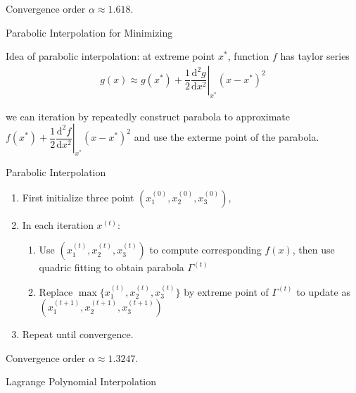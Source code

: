     Convergence order $ \alpha \approx 1.618 $.

\begin{point}
    \hypertarget{ParabolicInterpolation}{Parabolic Interpolation for Minimizing}
\end{point}

    Idea of parabolic interpolation: at extreme point $ x^* $, function $ f $ has taylor series
    \begin{align}
        g(x)\approx g(x^*)+\dfrac{1}{2}\left.\dfrac{\mathrm{d}^{2} g}{\mathrm{d}x^{2}}\right|_{x^*}(x-x^*)^2
    \end{align}
    
    we can iteration by repeatedly construct parabola to approximate $ f(x^*)+\dfrac{1}{2}\left.\dfrac{\mathrm{d}^{2} f}{\mathrm{d}x^{2}}\right|_{x^*}(x-x^*)^2 $ and use the exterme point of the parabola.

\begin{algorithm}{Parabolic Interpolation}

\begin{enumerate}[topsep=2pt,itemsep=2pt]
    \item First initialize three point $ (x_1^{(0)},x_2^{(0)},x_3^{(0)}) $,
    \item In each iteration $ x^{(t)} $:
    \begin{enumerate}[topsep=2pt,itemsep=2pt]
        \item Use $ (x_1^{(t)},x_2^{(t)},x_3^{(t)}) $ to compute corresponding $ f(x) $, then use quadric fitting to obtain parabola $ \Gamma^{(t)} $
    \item Replace $ \max\{x_1^{(t)},x_2^{(t)},x_3^{(t)}\} $ by extreme point of $ \Gamma ^{(t)} $ to update as $  (x_1^{(t+1)},x_2^{(t+1)},x_3^{(t+1)}) $
    \end{enumerate}
    \item Repeat until convergence.
\end{enumerate}
    
\end{algorithm}
    
    Convergence order $ \alpha \approx 1.3247 $.
    


\begin{point}
    Lagrange Polynomial Interpolation
\end{point}

